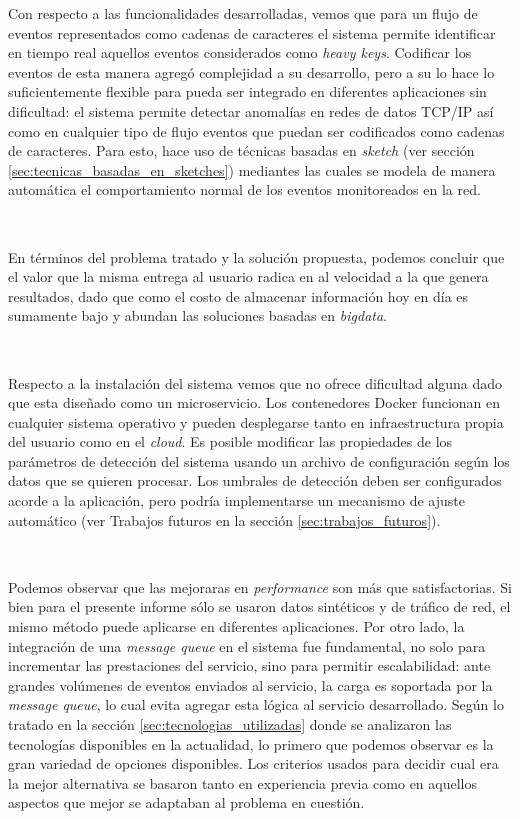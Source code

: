 \documentclass[a4paper,12pt, oneside]{article}
\begin{document}
Con respecto a las funcionalidades desarrolladas, vemos que para un flujo de eventos representados como cadenas de caracteres el sistema permite identificar en tiempo real aquellos eventos considerados como \textit{heavy keys}. Codificar los eventos de esta manera agregó complejidad a su desarrollo, pero a su lo hace lo suficientemente flexible para pueda ser integrado en diferentes aplicaciones sin dificultad: el sistema permite detectar anomalías en redes de datos TCP/IP así como en cualquier tipo de flujo eventos que puedan ser codificados como cadenas de caracteres. Para esto, hace uso de técnicas basadas en \textit{sketch} (ver sección \ref{sec:tecnicas_basadas_en_sketches}) mediantes las cuales se modela de manera automática el comportamiento normal de los eventos monitoreados en la red.

\

En términos del problema tratado y la solución propuesta, podemos concluir que el valor que la misma entrega al usuario radica en al velocidad a la que genera resultados, dado que como el costo de almacenar información hoy en día es sumamente bajo y abundan las soluciones basadas en \textit{bigdata}.

\

Respecto a la instalación del sistema vemos que no ofrece dificultad alguna dado que esta diseñado como un microservicio. Los contenedores Docker funcionan en cualquier sistema operativo y pueden desplegarse tanto en infraestructura propia del usuario como en el \textit{cloud}. Es posible modificar las propiedades de los parámetros de detección del sistema usando un archivo de configuración según los datos que se quieren procesar. Los umbrales de detección deben ser configurados acorde a la aplicación, pero podría implementarse un mecanismo de ajuste automático (ver Trabajos futuros en la sección \ref{sec:trabajos_futuros}).

\

Podemos observar que las mejoraras en \textit{performance} son más que satisfactorias. Si bien para el presente informe sólo se usaron datos sintéticos y de tráfico de red, el mismo método puede aplicarse en diferentes aplicaciones. Por otro lado, la integración de una \textit{message queue} en el sistema fue fundamental, no solo para incrementar las prestaciones del servicio, sino para permitir escalabilidad: ante grandes volúmenes de eventos enviados al servicio, la carga es soportada por la \textit{message queue}, lo cual evita agregar esta lógica al servicio desarrollado. Según lo tratado en la sección \ref{sec:tecnologias_utilizadas} donde se analizaron las tecnologías disponibles en la actualidad, lo primero que podemos observar es la gran variedad de opciones disponibles. Los criterios usados para decidir cual era la mejor alternativa se basaron tanto en experiencia previa como en aquellos aspectos que mejor se adaptaban al problema en cuestión.
\end{document}
